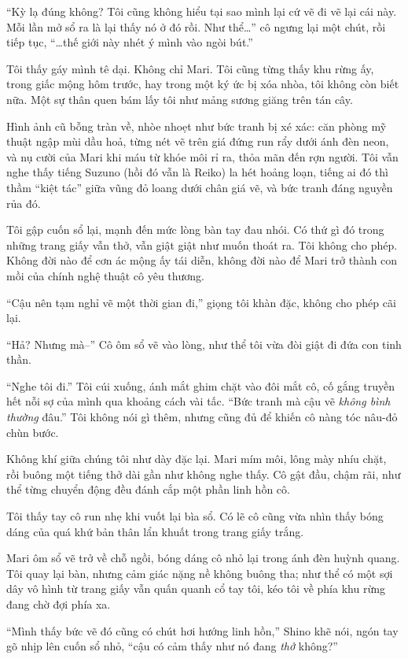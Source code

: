 \documentclass[../main.tex]{subfiles}
\begin{document}
``Kỳ lạ đúng không? Tôi cũng không hiểu tại sao mình lại cứ vẽ đi vẽ lại cái này. Mỗi lần mở sổ ra là lại thấy nó ở đó rồi. Như thể\dots'' cô ngưng lại một chút, rồi tiếp tục, ``\dots thế giới này nhét ý mình vào ngòi bút.''

Tôi thấy gáy mình tê dại. Không chỉ Mari. Tôi cũng từng thấy khu rừng ấy, trong giấc mộng hôm trước, hay trong một ký ức bị xóa nhòa, tôi không còn biết nữa. Một sự thân quen bám lấy tôi như mảng sương giăng trên tán cây.

Hình ảnh cũ bỗng tràn về, nhòe nhoẹt như bức tranh bị xé xác: căn phòng mỹ thuật ngập mùi dầu hoả, từng nét vẽ trên giá đứng run rẩy dưới ánh đèn neon, và nụ cười của Mari khi máu từ khóe môi rỉ ra, thỏa mãn đến rợn người. Tôi vẫn nghe thấy tiếng Suzuno (hồi đó vẫn là Reiko) la hét hoảng loạn, tiếng ai đó thì thầm ``kiệt tác'' giữa vũng đỏ loang dưới chân giá vẽ, và bức tranh đáng nguyền rủa đó.

Tôi gập cuốn sổ lại, mạnh đến mức lòng bàn tay đau nhói. Có thứ gì đó trong những trang giấy vẫn thở, vẫn giật giật như muốn thoát ra. Tôi không cho phép. Không đời nào để cơn ác mộng ấy tái diễn, không đời nào để Mari trở thành con mồi của chính nghệ thuật cô yêu thương.

``Cậu nên tạm nghỉ vẽ một thời gian đi,'' giọng tôi khàn đặc, không cho phép cãi lại.

``Hả? Nhưng mà--'' Cô ôm sổ vẽ vào lòng, như thể tôi vừa đòi giật đi đứa con tinh thần.

``Nghe tôi đi.'' Tôi cúi xuống, ánh mắt ghim chặt vào đôi mắt cô, cố gắng truyền hết nỗi sợ của mình qua khoảng cách vài tấc. ``Bức tranh mà cậu vẽ \emph{không bình thường} đâu.'' Tôi không nói gì thêm, nhưng cũng đủ để khiến cô nàng tóc nâu-đỏ chùn bước.

Không khí giữa chúng tôi như dày đặc lại. Mari mím môi, lông mày nhíu chặt, rồi buông một tiếng thở dài gần như không nghe thấy. Cô gật đầu, chậm rãi, như thể từng chuyển động đều đánh cắp một phần linh hồn cô.

Tôi thấy tay cô run nhẹ khi vuốt lại bìa sổ. Có lẽ cô cũng vừa nhìn thấy bóng dáng của quá khứ bản thân lẩn khuất trong trang giấy trắng.

Mari ôm sổ vẽ trở về chỗ ngồi, bóng dáng cô nhỏ lại trong ánh đèn huỳnh quang. Tôi quay lại bàn, nhưng cảm giác nặng nề không buông tha; như thể có một sợi dây vô hình từ trang giấy vẫn quấn quanh cổ tay tôi, kéo tôi về phía khu rừng đang chờ đợi phía xa.

``Mình thấy bức vẽ đó cũng có chút hơi hướng linh hồn,'' Shino khẽ nói, ngón tay gõ nhịp lên cuốn sổ nhỏ, ``cậu có cảm thấy như nó đang \emph{thở} không?''
\end{document}
